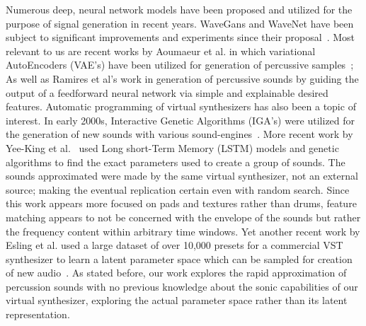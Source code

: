 \documentclass[runningheads,a4paper]{llncs}
\begin{document}
\begin{center}
\begin{table}[h*]
\caption{for reference, will delete} %
\end{table}
\end{center}
Numerous deep, neural network models have been proposed and utilized for the purpose of signal generation in recent years. WaveGans and WaveNet have been subject to significant improvements and experiments since their proposal~\cite{nsynth2017,yamamoto2020parallel,oord2017parallel}. Most relevant to us are recent works by Aoumaeur et al. in which variational AutoEncoders (VAE's) have been utilized for generation of percussive samples~\cite{aouameur2019neural}; As well as Ramires et al's work in generation of percussive sounds by guiding the output of a feedforward neural network via simple and explainable desired features. 
Automatic programming of virtual synthesizers has also been a topic of interest. In early 2000s, Interactive Genetic Algorithms (IGA's) were utilized for the generation of new sounds with various sound-engines~\cite{johnson1999exploring,dahlstedt2001creating}. More recent work by Yee-King et al.~\cite{yee2018automatic} used Long short-Term Memory (LSTM) models and genetic algorithms to find the exact parameters used to create a group of sounds. The sounds approximated were made by the same virtual synthesizer, not an external source; making the eventual replication certain even with random search. Since this work appears more focused on pads and textures rather than drums, feature matching appears to not be concerned with the envelope of the sounds but rather the frequency content within arbitrary time windows. Yet another recent work by Esling et al. used a large dataset of over 10,000 presets for a commercial VST synthesizer to learn a latent parameter space which can be sampled for creation of new audio~\cite{esling2019universal}. As stated before, our work explores the rapid approximation of percussion sounds with no previous knowledge about the sonic capabilities of our virtual synthesizer, exploring the actual parameter space rather than its latent representation.




\end{document}
